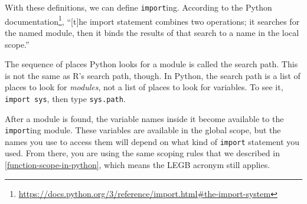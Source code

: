 \documentclass[
  12pt,
  krantz2]{krantz}
\renewcommand{\href}[2]{#2\footnote{\url{#1}}}
\begin{document}
With these definitions, we can define \texttt{import}ing. According to the \href{https://docs.python.org/3/reference/import.html\#the-import-system}{Python documentation}, ``{[}t{]}he import statement combines two operations; it searches for the named module, then it binds the results of that search to a name in the local scope.''

The sequence of places Python looks for a module is called the search path. This is not the same as R's search path, though. In Python, the search path is a list of places to look for \emph{modules}, not a list of places to look for variables. To see it, \texttt{import\ sys}, then type \texttt{sys.path}.

After a module is found, the variable names inside it become available to the \texttt{import}ing module. These variables are available in the global scope, but the names you use to access them will depend on what kind of \texttt{import} statement you used. From there, you are using the same scoping rules that we described in \ref{function-scope-in-python}, which means the LEGB acronym still applies.
\end{document}
